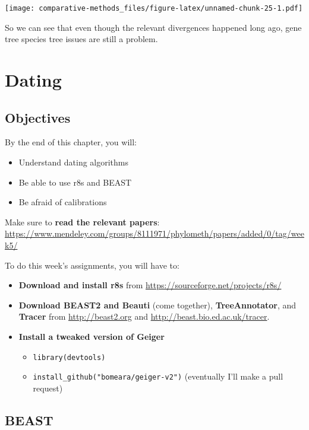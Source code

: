\documentclass[
]{article}
\providecommand{\tightlist}{%
  \setlength{\itemsep}{0pt}\setlength{\parskip}{0pt}}
\begin{document}
\texttt{[image: comparative-methods\_files/figure-latex/unnamed-chunk-25-1.pdf]}

So we can see that even though the relevant divergences happened long ago, gene tree species tree issues are still a problem.

\hypertarget{dating}{%
\section{Dating}\label{dating}}

\hypertarget{objectives-8}{%
\subsection{Objectives}\label{objectives-8}}

By the end of this chapter, you will:

\begin{itemize}
\tightlist
\item
  Understand dating algorithms
\item
  Be able to use r8s and BEAST
\item
  Be afraid of calibrations
\end{itemize}

Make sure to \textbf{read the relevant papers}: \url{https://www.mendeley.com/groups/8111971/phylometh/papers/added/0/tag/week5/}

To do this week's assignments, you will have to:

\begin{itemize}
\tightlist
\item
  \textbf{Download and install r8s} from \url{https://sourceforge.net/projects/r8s/}
\item
  \textbf{Download BEAST2 and Beauti} (come together), \textbf{TreeAnnotator}, and \textbf{Tracer} from \url{http://beast2.org} and \url{http://beast.bio.ed.ac.uk/tracer}.
\item
  \textbf{Install a tweaked version of Geiger}

  \begin{itemize}
  \tightlist
  \item
    \texttt{library(devtools)}
  \item
    \texttt{install\_github("bomeara/geiger-v2")} (eventually I'll make a pull request)
  \end{itemize}
\end{itemize}

\hypertarget{beast}{%
\subsection{BEAST}\label{beast}}
\end{document}
